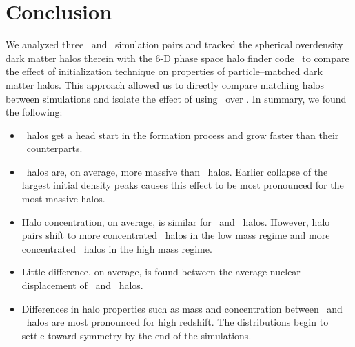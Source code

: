 \section{Conclusion}
\label{sec:conclusion}


We analyzed three \lpt\ and \za\ simulation pairs and tracked the spherical overdensity dark matter halos therein with the 6-D phase space halo finder code \rockstar\ to compare the effect of initialization technique on properties of particle--matched dark matter halos.  This approach allowed us to directly compare matching halos between simulations and isolate the effect of using \lpt\ over \za.  In summary, we found the following:

\begin{itemize}
	\item \lpt\ halos get a head start in the formation process and grow faster than their \za\ counterparts.
	\item \lpt\ halos are, on average, more massive than \za\ halos.  Earlier collapse of the largest initial density peaks causes this effect to be most pronounced for the most massive halos.
	\item Halo concentration, on average, is similar for \lpt\ and \za\ halos.  However, halo pairs shift to more concentrated \lpt\ halos in the low mass regime and more concentrated \za\ halos in the high mass regime.
	\item Little difference, on average, is found between the average nuclear displacement of \lpt\ and \za\ halos.
	\item Differences in halo properties such as mass and concentration between \lpt\ and \za\ halos are most pronounced for high redshift.  The distributions begin to settle toward symmetry by the end of the simulations.
\end{itemize}


